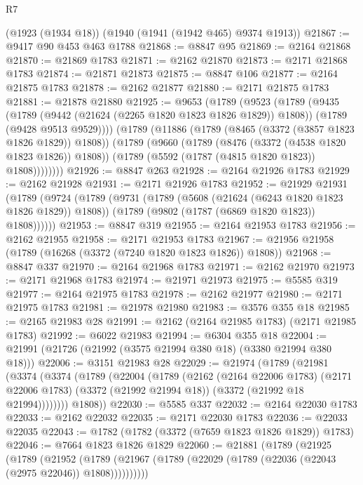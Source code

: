 \begin{lexlean}{R7}
\begin{coremodule}
    (@1923 (@1934 @18))
    (@1940 (@1941 (@1942 @465) @9374 @1913))
@21867 := @9417 @90 @453 @463 @1788
@21868 := @8847 @95
@21869 := @2164 @21868
@21870 := @21869 @1783
@21871 := @2162 @21870
@21873 := @2171 @21868 @1783
@21874 := @21871 @21873
@21875 := @8847 @106
@21877 := @2164 @21875 @1783
@21878 := @2162 @21877
@21880 := @2171 @21875 @1783
@21881 := @21878 @21880
@21925 := @9653
    (@1789
      (@9523
        (@1789
          (@9435
            (@1789 (@9442 (@21624 (@2265 @1820 @1823 @1826 @1829)) @1808))
            (@1789 (@9428 @9513 @9529))))
        (@1789
          (@11886
            (@1789 (@8465 (@3372 (@3857 @1823 @1826 @1829)) @1808))
            (@1789
              (@9660
                (@1789 (@8476 (@3372 (@4538 @1820 @1823 @1826)) @1808))
                (@1789 (@5592 (@1787 (@4815 @1820 @1823)) @1808))))))))
@21926 := @8847 @263
@21928 := @2164 @21926 @1783
@21929 := @2162 @21928
@21931 := @2171 @21926 @1783
@21952 := @21929
    @21931
    (@1789
      (@9724
        (@1789
          (@9731
            (@1789 (@5608 (@21624 (@6243 @1820 @1823 @1826 @1829)) @1808))
            (@1789 (@9802 (@1787 (@6869 @1820 @1823)) @1808))))))
@21953 := @8847 @319
@21955 := @2164 @21953 @1783
@21956 := @2162 @21955
@21958 := @2171 @21953 @1783
@21967 := @21956 @21958 (@1789 (@16268 (@3372 (@7240 @1820 @1823 @1826)) @1808))
@21968 := @8847 @337
@21970 := @2164 @21968 @1783
@21971 := @2162 @21970
@21973 := @2171 @21968 @1783
@21974 := @21971 @21973
@21975 := @5585 @319
@21977 := @2164 @21975 @1783
@21978 := @2162 @21977
@21980 := @2171 @21975 @1783
@21981 := @21978 @21980
@21983 := @3576 @355 @18
@21985 := @2165 @21983 @28
@21991 := @2162 (@2164 @21985 @1783) (@2171 @21985 @1783)
@21992 := @6022 @21983
@21994 := @6304 @355 @18
@22004 := @21991 (@21726 (@21992 (@3575 @21994 @380 @18) (@3380 @21994 @380 @18)))
@22006 := @3151 @21983 @28
@22029 := @21974
    (@1789
      (@21981
        (@3374
          (@3374
            (@1789
              (@22004
                (@1789
                  (@2162
                    (@2164 @22006 @1783)
                    (@2171 @22006 @1783)
                    (@3372 (@21992 @21994 @18))
                    (@3372 (@21992 @18 @21994))))))))
        @1808))
@22030 := @5585 @337
@22032 := @2164 @22030 @1783
@22033 := @2162 @22032
@22035 := @2171 @22030 @1783
@22036 := @22033 @22035
@22043 := @1782 (@1782 (@3372 (@7659 @1823 @1826 @1829)) @1783)
@22046 := @7664 @1823 @1826 @1829
@22060 := @21881
    (@1789
      (@21925
        (@1789
          (@21952
            (@1789 (@21967 (@1789 (@22029 (@1789 (@22036 (@22043 (@2975 @22046)) @1808))))))))))

\end{coremodule}
\end{lexlean}
